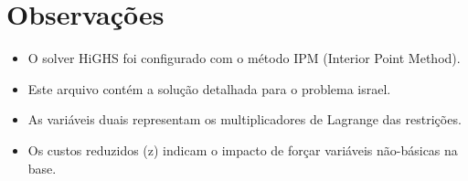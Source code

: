 \documentclass[12pt]{article}
\begin{document}
\section{Observações}

\begin{itemize}
\item O solver HiGHS foi configurado com o método IPM (Interior Point Method).
\item Este arquivo contém a solução detalhada para o problema israel.
\item As variáveis duais representam os multiplicadores de Lagrange das restrições.
\item Os custos reduzidos (z) indicam o impacto de forçar variáveis não-básicas na base.
\end{itemize}
\end{document}

